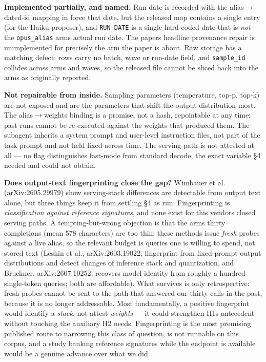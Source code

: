 \textbf{Implemented partially, and named.} Run date is recorded with the alias\(\rightarrow\)dated-id mapping in force that date, but the released map contains a single entry (for the Haiku proposer), and \texttt{RUN\_DATE} is a single hard-coded date that is \emph{not} the \texttt{opus\_alias} arm\textquotesingle s actual run date. The paper\textquotesingle s headline provenance repair is unimplemented for precisely the arm the paper is about. Raw storage has a matching defect: rows carry no batch, wave or run-date field, and \texttt{sample\_id} collides across arms and waves, so the released file cannot be sliced back into the arms as originally reported.

\textbf{Not repairable from inside.} Sampling parameters (temperature, top-p, top-k) are not exposed and are the parameters that shift the output distribution most. The alias\(\rightarrow\)weights binding is a promise, not a hash, repointable at any time; past runs cannot be re-executed against the weights that produced them. The subagent inherits a system prompt and user-level instruction files, not part of the task prompt and not held fixed across time. The serving path is not attested at all --- no flag distinguishes fast-mode from standard decode, the exact variable §4 needed and could not obtain.

\textbf{Does output-text fingerprinting close the gap?} Wimbauer et al. (arXiv:2605.29979) show serving-stack differences are detectable from output text alone, but three things keep it from settling §4 as run. Fingerprinting is \emph{classification against reference signatures}, and none exist for this vendor\textquotesingle s closed serving paths. A tempting-but-wrong objection is that the arm\textquotesingle s thirty completions (mean 578 characters) are too thin: these methods issue \emph{fresh} probes against a live alias, so the relevant budget is queries one is willing to spend, not stored text (Leshin et al., arXiv:2603.19022, fingerprint from fixed-prompt output distributions and detect changes of inference stack and quantization, and Bruckner, arXiv:2607.10252, recovers model identity from roughly a hundred single-token queries; both are affordable). What survives is only retrospective: fresh probes cannot be sent to the path that answered our thirty calls in the past, because it is no longer addressable. Most fundamentally, a positive fingerprint would identify a \emph{stack}, not attest \emph{weights} --- it could strengthen H1\textquotesingle s antecedent without touching the auxiliary H2 needs. Fingerprinting is the most promising published route to narrowing this class of question, is not runnable on this corpus, and a study banking reference signatures while the endpoint is available would be a genuine advance over what we did.

